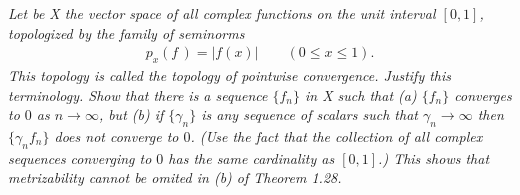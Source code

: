 \noindent
\textit{
Let be X the vector space of all complex functions on the unit interval 
$[0, 1]$, topologized by the family of seminorms 
%
  \begin{align}
    \mathit{p_{x}(f\,)=|f(x)| \quad\quad (0\leq x\leq 1).\nonumber}
  \end{align}
%
This topology is called the topology of pointwise convergence. 
Justify this terminology.
Show that there is a sequence $\{f_n\}$ in X such that (a) $\{f_n\}$ converges 
to $0$ as $n \to\infty$, but (b) if $\{γ_n\}$ is any sequence of scalars such 
that $γ_n\to\infty$ then $\{γ_nf_n\}$ does not converge to $0$. 
(Use the fact that the collection of all complex sequences converging to $0$ 
has the same cardinality as $[0, 1]$.)
This shows that metrizability cannot be omited in (b) of Theorem 1.28.
}
